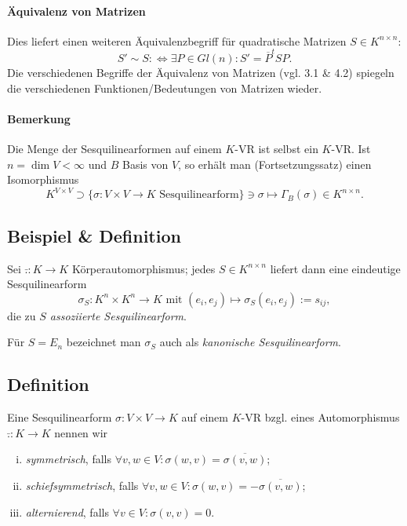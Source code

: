 \paragraph{Äquivalenz von Matrizen}
Dies liefert einen weiteren Äquivalenzbegriff für quadratische Matrizen $ S\in K^{n\times n} $:
		\[ S' \sim S :\Leftrightarrow \exists  P\in Gl(n): S' = \overline{P}^tSP. \]
	Die verschiedenen Begriffe der Äquivalenz von Matrizen (vgl. 3.1 \& 4.2) spiegeln die verschiedenen Funktionen/Bedeutungen von Matrizen wieder.
	
\paragraph{Bemerkung}
	Die Menge der Sesquilinearformen auf einem $ K $-VR ist selbst ein $ K $-VR. Ist $ n=\dim V< \infty $ und $ B $ Basis von $ V $, so erhält man (Fortsetzungssatz) einen Isomorphismus
		\[ K^{V\times V}\supset \{\sigma:V\times V\to K \text{ Sesquilinearform}\}\ni \sigma \mapsto \Gamma_B(\sigma)\in K^{n\times n}. \]
\subsection{Beispiel \& Definition} 
\begin{Definition}
	Sei $ \bar{.}:K\to K $ Körperautomorphismus; jedes $ S\in K^{n\times n} $ liefert dann eine eindeutige Sesquilinearform
		\[ \sigma_S:K^n\times K^n \to K \text{ mit } (e_i,e_j)\mapsto \sigma_S(e_i,e_j):= s_{ij}, \] 
	die zu \emph{$ S $ assoziierte Sesquilinearform}.

	Für $ S = E_n $ bezeichnet man $ \sigma_S $ auch als \emph{kanonische Sesquilinearform}.
\end{Definition}

\subsection{Definition}
\begin{Definition}
	Eine Sesquilinearform $ \sigma:V\times V\to K $ auf einem $ K $-VR bzgl. eines Automorphismus $ \bar{.}:K\to K $ nennen wir
		\begin{enumerate}[(i)]
			\item \emph{symmetrisch}, falls $\forall v,w\in V: \sigma(w,v) = \overline{\sigma(v,w)} $;
			\item \emph{schiefsymmetrisch}, falls $ \forall v,w\in V: \sigma(w,v) = - \overline{\sigma(v,w)}$;
			\item \emph{alternierend}, falls $\forall v \in V: \sigma(v,v) = 0.$
		\end{enumerate}
\end{Definition}

